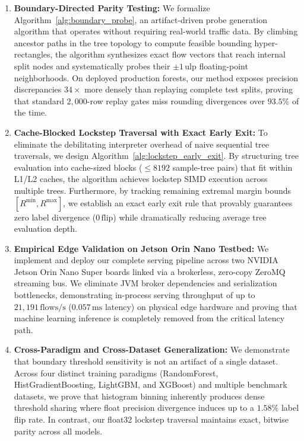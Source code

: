 \begin{enumerate}
    \item \textbf{Boundary-Directed Parity Testing:} We formalize Algorithm~\ref{alg:boundary_probe}, an artifact-driven probe generation algorithm that operates without requiring real-world traffic data. By climbing ancestor paths in the tree topology to compute feasible bounding hyper-rectangles, the algorithm synthesizes exact flow vectors that reach internal split nodes and systematically probes their $\pm 1\,\text{ulp}$ floating-point neighborhoods. On deployed production forests, our method exposes precision discrepancies $34\times$ more densely than replaying complete test splits, proving that standard $2{,}000$-row replay gates miss rounding divergences over $93.5\%$ of the time.
    \item \textbf{Cache-Blocked Lockstep Traversal with Exact Early Exit:} To eliminate the debilitating interpreter overhead of naive sequential tree traversals, we design Algorithm~\ref{alg:lockstep_early_exit}. By structuring tree evaluation into cache-sized blocks ($\le 8192$ sample-tree pairs) that fit within L1/L2 caches, the algorithm achieves lockstep SIMD execution across multiple trees. Furthermore, by tracking remaining extremal margin bounds $[R^{\min}, R^{\max}]$, we establish an exact early exit rule that provably guarantees zero label divergence ($0\,\text{flip}$) while dramatically reducing average tree evaluation depth.
    \item \textbf{Empirical Edge Validation on Jetson Orin Nano Testbed:} We implement and deploy our complete serving pipeline across two NVIDIA Jetson Orin Nano Super boards linked via a brokerless, zero-copy ZeroMQ streaming bus. We eliminate JVM broker dependencies and serialization bottlenecks, demonstrating in-process serving throughput of up to $21{,}191\,\text{flows/s}$ ($0.057\,\text{ms}$ latency) on physical edge hardware and proving that machine learning inference is completely removed from the critical latency path.
    \item \textbf{Cross-Paradigm and Cross-Dataset Generalization:} We demonstrate that boundary threshold sensitivity is not an artifact of a single dataset. Across four distinct training paradigms (RandomForest, HistGradientBoosting, LightGBM, and XGBoost) and multiple benchmark datasets, we prove that histogram binning inherently produces dense threshold sharing where float precision divergence induces up to a $1.58\%$ label flip rate. In contrast, our float32 lockstep traversal maintains exact, bitwise parity across all models.
\end{enumerate}

